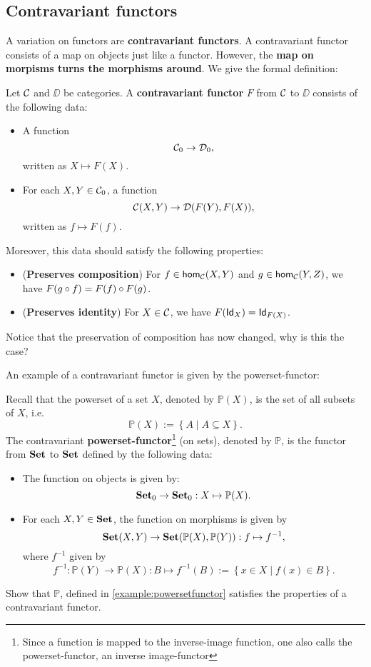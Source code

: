 \subsection{Contravariant functors}

A variation on functors are \textbf{contravariant functors}.
A contravariant functor consists of a map on objects just like a functor.
However, the \textbf{map on morpisms turns the morphisms around}.
We give the formal definition:

\begin{dfn} Let $\CC$ and $\DD$ be categories. A \textbf{contravariant functor} $F$ from $\CC$ to $\DD$ consists of the following data:
\begin{itemize}
\item A function 
\[
\Ob{\CC} \to \Ob{\DD},
\]
written as $X\mapsto F(X)$.
\item For each $X,Y\in \Ob{\CC}$, a function
\[
\CHom{\CC}{X}{Y} \to \CHom{\DD}{F(Y)}{F(X)},
\]
written as $f\mapsto F(f)$.
\end{itemize}
Moreover, this data should satisfy the following properties:
\begin{itemize}
\item (\textbf{Preserves composition}) For $f\in \Hom[\CC]{X}{Y}$ and $g\in \Hom[\CC]{Y}{Z}$, we have $F(\co f g) =  \co {F(g)}{F(f)}$.
\item (\textbf{Preserves identity}) For $X\in\CC$, we have $F(\Id[X]) = \Id[F(X)]$.
\end{itemize}
\end{dfn}

\begin{exer} Notice that the preservation of composition has now changed, why is this the case?
\end{exer}

An example of a contravariant functor is given by the powerset-functor:
\begin{exa} \label{example:powersetfunctor} Recall that the powerset of a set $X$, denoted by $\mathbb{P}(X)$, is the set of all subsets of $X$, i.e. 
\[
\mathbb{P}(X) :=  \left\{A \mid A\subseteq X\right\}.
\]
The contravariant \textbf{powerset-functor}\footnote{Since a function is mapped to the inverse-image function, one also calls the powerset-functor, an inverse image-functor} (on sets), denoted by $\mathbb{P}$, is the functor from $\SET$ to $\SET$ defined by the following data:
\begin{itemize}
\item The function on objects is given by:
\[
\Ob{\SET}\to \Ob{\SET}: X\mapsto \mathbb{P}(X).
\]
\item For each $X,Y\in\SET$, the function on morphisms is given by
\[
\CHom{\SET}{X}{Y} \to \CHom{\SET}{\mathbb{P}(X)}{\mathbb{P}(Y)}: f\mapsto f^{-1},
\]
where $f^{-1}$ given by
\[
f^{-1}:\mathbb{P}(Y)\to \mathbb{P}(X): B\mapsto f^{-1}(B) := \left\{x\in X \mid f(x)\in B\right\}.
\]
\end{itemize}
\end{exa}

\begin{exer} Show that $\mathbb{P}$, defined in \cref{example:powersetfunctor} satisfies the properties of a contravariant functor.
\end{exer}



